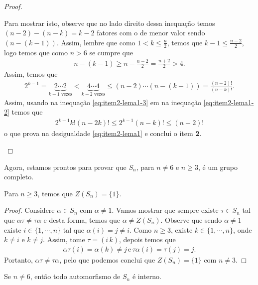 \begin{proof}
\begin{itemize}
\begin{equation}
      \end{equation}
      Para mostrar isto, observe que no lado direito dessa inequação temos $(n-2)-(n-k)=k-2$ fatores com o de menor valor sendo $(n-(k-1))$. Assim, lembre que como $1<k\leq \frac{n}{2}$, temos que $k-1\leq\frac{n-2}{2}$, logo temos que como $n>6$ se cumpre que 
      \begin{align*}
        n-(k-1)\geq n-\frac{n-2}{2}=\frac{n+2}{2}>4.
      \end{align*}
      Assim, temos que
      \begin{align*}
        2^{k-1}=\underbrace{2\cdots 2}_{k-1\text{ vezes}}<\underbrace{4\cdots 4}_{k-2\text{ vezes}}\leq (n-2)\cdots(n-(k-1))=\frac{(n-2)!}{(n-k)!}.
      \end{align*}
      Assim, usando na inequação \eqref{eq:item2-lema1-3} em na inequação \eqref{eq:item2-lema1-2} temos que
      \begin{align*}
        2^{k-1}k!(n-2k)!\leq 2^{k-1}(n-k)!\leq (n-2)!
      \end{align*}
      o que prova na desigualdade \eqref{eq:item2-lema1} e conclui o item \textbf{2}.
  \end{itemize}
\end{proof}
Agora, estamos prontos para provar que $S_n$, para $n\neq 6$ e $n\geq 3$, é um grupo completo.
\begin{proposition}\label{prop:2.2.4}
  Para $n\geq 3$, temos que $Z(S_n)=\{1\}$.
\end{proposition}
\begin{proof} 
  Considere $\alpha\in S_n$ com $\alpha\neq 1$. Vamos mostrar que sempre existe $\tau\in S_n$ tal que $\alpha\tau\neq\tau\alpha$ e desta forma, temos que $\alpha\neq Z(S_n)$. Observe que sendo $\alpha\neq 1$ existe $i\in\{1,\cdots,n\}$ tal que $\alpha(i)=j\neq i$. Como $n\geq 3$, existe $k\in\{1,\cdots,n\}$, onde $k\neq i$ e $k\neq j$. Assim, tome $\tau=(i\,k)$, depois temos que
  \begin{align*}
    \alpha\tau(i)=\alpha(k)\neq j\,\text{e}\,\tau\alpha(i)=\tau(j)=j.
  \end{align*}
  Portanto, $\alpha\tau\neq\tau\alpha$, pelo que podemos conclui que $Z(S_n)=\{1\}$ com $n\neq 3$. 
\end{proof}
\begin{theorem}\label{theo:2.2.5}
  Se $n\neq 6$, então todo automorfismo de $S_n$ é interno. 
\end{theorem}
